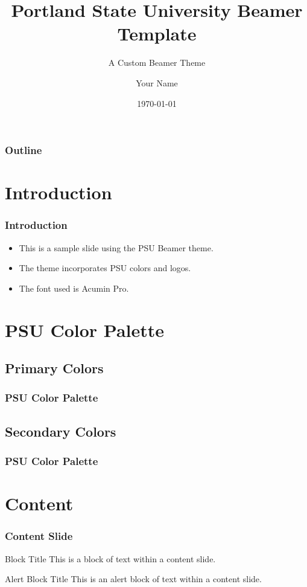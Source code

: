 \documentclass{beamer}
\title{Portland State University Beamer Template}
\subtitle{A Custom Beamer Theme}
\author{Your Name}
\institute{Portland State University}
\date{\today}
\begin{document}
    {
    \begin{frame}
		\titlepage
	\end{frame}
    }

    \begin{frame}
        \frametitle{Outline}
        \tableofcontents
    \end{frame}

    \section{Introduction}
	\begin{frame}
		\frametitle{Introduction}
		\begin{itemize}
			\item This is a sample slide using the PSU Beamer theme.

			\item The theme incorporates PSU colors and logos.

			\item The font used is Acumin Pro.
		\end{itemize}
	\end{frame}

    \section{PSU Color Palette}
    \subsection{Primary Colors}
	\begin{frame}
		\frametitle{PSU Color Palette}
		\showPSUColorsPrimary
	\end{frame}

    \subsection{Secondary Colors}
	\begin{frame}
		\frametitle{PSU Color Palette}
		\showPSUColorsSecondary
	\end{frame}

    \section{Content}
	\begin{frame}
		\frametitle{Content Slide}
		\begin{block}{Block Title}
			This is a block of text within a content slide.
		\end{block}
        \begin{alertblock}{Alert Block Title}
            This is an alert block of text within a content slide.
        \end{alertblock}
	\end{frame}
\end{document}
